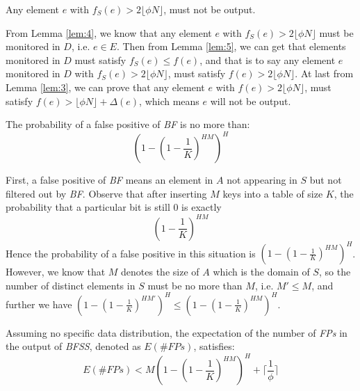 \documentclass[conference]{IEEEtran}
\begin{document}
\begin{lemma}\label{lem:6}
	 Any element $e$ with $f_S(e)>2\lfloor \phi N\rfloor$, must not be output.
\end{lemma}

\begin{IEEEproof}
From Lemma \ref{lem:4}, we know that any element $e$ with $f_S(e)>2\lfloor \phi N\rfloor$ must be monitored in $D$, i.e. $e\in E$. Then from Lemma \ref{lem:5}, we can get that elements monitored in $D$ must satisfy $f_S(e)\leq f(e)$, and that is to say any element $e$ monitored in $D$ with $f_S(e)>2\lfloor \phi N\rfloor$, must satisfy $f(e)>2\lfloor \phi N\rfloor$. At last from Lemma \ref{lem:3}, we can prove that any element $e$ with $f(e)>2\lfloor \phi N\rfloor$, must satisfy $f(e)>\lfloor \phi N\rfloor+\Delta(e)$, which means $e$ will not be output.
\end{IEEEproof}

\begin{lemma}\label{lem:7}
The probability of a false positive of \emph{BF} is no more than:
\begin{equation}
(1-(1-\frac{1}{K})^{HM})^H
\end{equation}
\end{lemma}

\begin{IEEEproof}
First, a false positive of \emph{BF} means an element in $A$ not appearing in $S$ but not filtered out by \emph{BF}. Observe that after inserting $M$ keys into a table of size $K$, the probability that a particular bit is still 0 is exactly
\begin{equation} 
(1-\frac{1}{K})^{HM}
\end{equation}
\indent Hence the probability of a false positive in this situation is $(1-(1-\frac{1}{K})^{HM})^H$. However, we know that $M$ denotes the size of $A$ which is the domain of $S$, so the number of distinct elements in $S$ must be no more than $M$, i.e. $M'\leq M$, and further we have $(1-(1-\frac{1}{K})^{HM'})^H\leq (1-(1-\frac{1}{K})^{HM})^H$.
\end{IEEEproof}

\begin{theorem}\label{thm:2}
Assuming no specific data distribution, the expectation of the number of \emph{FPs} in the output of \emph{BFSS}, denoted as $E(\#FPs)$, satisfies:
\begin{equation}\label{eq:7}
E(\#FPs)<M(1-(1-\frac{1}{K})^{HM})^H + \lceil\frac{1}{\phi}\rceil
\end{equation}
\end{theorem}
\end{document}
